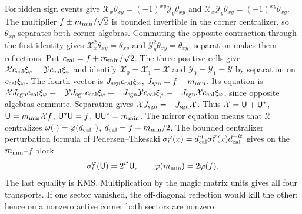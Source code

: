 Forbidden sign events give $\mathcal X_x\theta_{xy}=(-1)^{xy}\mathcal Y_y\theta_{xy}$ and $\mathcal X_x\mathcal Y_y\theta_{xy}=(-1)^{xy}\theta_{xy}$. The multiplier $f\pm m_{\rm min}/\sqrt2$ is bounded invertible in the corner centralizer, so $\theta_{xy}$ separates both corner algebras. Commuting the opposite contraction through the first identity gives $\mathcal X_x^2\theta_{xy}=\theta_{xy}$ and $\mathcal Y_y^2\theta_{xy}=\theta_{xy}$; separation makes them reflections. Put $c_{\rm cal}=f+m_{\rm min}/\sqrt2$. The three positive cells give $\mathcal X c_{\rm cal}\xi_\varphi=\mathcal Y c_{\rm cal}\xi_\varphi$ and identify $\mathcal X_0=\mathcal X_1=\mathcal X$ and $\mathcal Y_0=\mathcal Y_1=\mathcal Y$ by separation on $c_{\rm cal}\xi_\varphi$. The fourth vector is ${J_{\rm sgn}} c_{\rm cal}\xi_\varphi$, ${J_{\rm sgn}}=f-m_{\rm min}$. Its equation is $\mathcal X{J_{\rm sgn}} c_{\rm cal}\xi_\varphi=-\mathcal Y{J_{\rm sgn}} c_{\rm cal}\xi_\varphi=-{J_{\rm sgn}}\mathcal Y c_{\rm cal}\xi_\varphi=-{J_{\rm sgn}}\mathcal X c_{\rm cal}\xi_\varphi$, since opposite algebras commute. Separation gives $\mathcal X{J_{\rm sgn}}=-{J_{\rm sgn}}\mathcal X$. Thus $\mathcal X={\mathsf U}+{\mathsf U}^*$, ${\mathsf U}=m_{\rm min}\mathcal Xf$, ${\mathsf U}^*{\mathsf U}=f$, ${\mathsf U}{\mathsf U}^*=m_{\rm min}$. The mirror equation means that $\mathcal X$ centralizes $\omega(\cdot)=\varphi(d_{\rm cal}\,\cdot)$, $d_{\rm cal}=f+m_{\rm min}/2$. The bounded centralizer perturbation formula of Pedersen--Takesaki \cite[Lemma 4.5]{PT} $\sigma_t^\omega(x)=d_{\rm cal}^{it}\sigma_t^\varphi(x)d_{\rm cal}^{-it}$ gives on the $m_{\rm min}$--$f$ block
\begin{equation}\label{eq:bridgecomm}
 \sigma_t^\varphi({\mathsf U})=2^{it}{\mathsf U},\qquad \varphi(m_{\rm min})=2\varphi(f).
\end{equation}
The last equality is KMS. Multiplication by the magic matrix units gives all four transports. If one sector vanished, the off-diagonal reflection would kill the other; hence on a nonzero active corner both sectors are nonzero.


